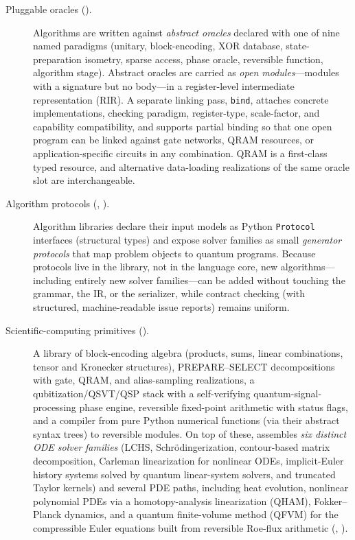 \begin{description}
\item[Pluggable oracles ().]  Algorithms are written
  against \emph{abstract oracles} declared with one of nine named paradigms
  (unitary, block-encoding, XOR database, state-preparation isometry, sparse
  access, phase oracle, reversible function, algorithm stage).  Abstract
  oracles are carried as \emph{open modules}---modules with a signature but no
  body---in a register-level intermediate representation (RIR).  A separate
  linking pass, \texttt{bind}, attaches concrete implementations, checking
  paradigm, register-type, scale-factor, and capability compatibility, and
  supports partial binding so that one open program can be linked against
  gate networks, QRAM resources, or application-specific circuits in any
  combination.  QRAM is a first-class typed resource, and alternative
  data-loading realizations of the same oracle slot are interchangeable.
\item[Algorithm protocols (, ).]
  Algorithm libraries declare their input models as Python \texttt{Protocol}
  interfaces (structural types) and expose solver families as small
  \emph{generator protocols} that map problem objects to quantum programs.
  Because protocols live in the library, not in the language core, new
  algorithms---including entirely new solver families---can be added without
  touching the grammar, the IR, or the serializer, while contract checking
  (with structured, machine-readable issue reports) remains uniform.
\item[Scientific-computing primitives ().]  A library
  of block-encoding algebra (products, sums, linear combinations, tensor and
  Kronecker structures), PREPARE--SELECT decompositions with gate, QRAM, and
  alias-sampling realizations, a qubitization/QSVT/QSP stack with a
  self-verifying quantum-signal-processing phase engine, reversible
  fixed-point arithmetic with status flags, and a compiler from pure Python
  numerical functions (via their abstract syntax trees) to reversible
  modules.  On top of these, \pqlang{} assembles \emph{six distinct ODE
  solver families} (LCHS, Schr\"odingerization, contour-based matrix
  decomposition, Carleman linearization for nonlinear ODEs, implicit-Euler
  history systems solved by quantum linear-system solvers, and truncated
  Taylor kernels) and several PDE paths, including heat evolution, nonlinear
  polynomial PDEs via a homotopy-analysis linearization (QHAM), Fokker--Planck
  dynamics, and a quantum finite-volume method (QFVM) for the compressible
  Euler equations built from reversible Roe-flux arithmetic
  (, ).
\end{description}

